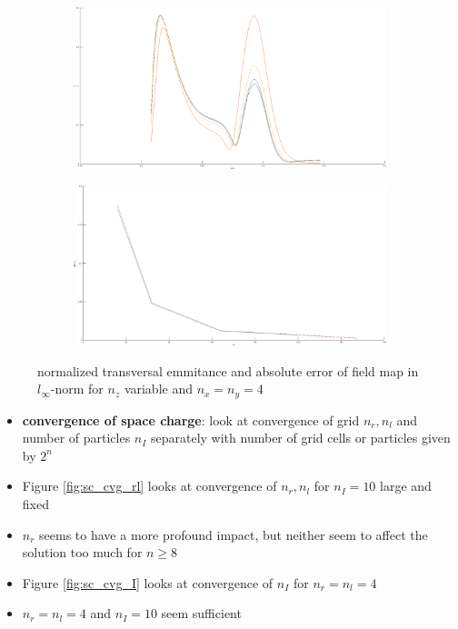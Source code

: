 \begin{center}
\begin{figure}[H]
   \begin{subfigure}{0.45\textwidth}
      \includegraphics[width=\textwidth]{fig/map_emit_z}
   \end{subfigure}
   \begin{subfigure}{0.45\textwidth}
      \includegraphics[width=\textwidth]{fig/map_cvg_z}
   \end{subfigure}
   \caption{normalized transversal emmitance and absolute error of field map in $l_\infty$-norm for $n_z$ variable and $n_x=n_y=4$}
   \label{fig:map_cvg_z}
\end{figure}
\end{center}

\begin{itemize}
   \item \textbf{convergence of space charge}: look at convergence of grid $n_r, n_l$ and number of particles $n_I$ separately with number of grid cells or particles given by $2^n$

   \item Figure \ref{fig:sc_cvg_rl} looks at convergence of $n_r, n_l$ for $n_I=10$ large and fixed
   \item $n_r$ seems to have a more profound impact, but neither seem to affect the solution too much for $n\geq8$

   \item Figure \ref{fig:sc_cvg_I} looks at convergence of $n_I$ for $n_r=n_l=4$
   \item $n_r=n_l=4$ and $n_I=10$ seem sufficient
\end{itemize}


